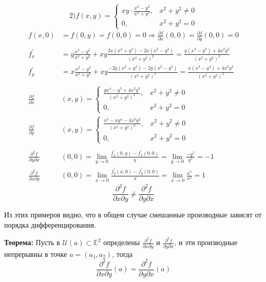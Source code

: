 \documentclass[a4paper,12pt]{article} %
\begin{document}
	\vspace{10mm}
	$$
	2)f(x, y) = 
	\begin{cases*} 
		xy\cdot\frac{x^2-y^2}{x^2+y^2},& \text{$x^2+y^2\neq 0$}\\
		0,& \text{$x^2+y^2= 0$}
	\end{cases*}$$
    \begin{align*}
	f(x, 0) &= f(0, y) = f(0, 0) = 0 \Rightarrow \frac{\partial f}{\partial x}(0, 0) = \frac{\partial f}{\partial y}(0, 0) = 0\\&\\
	f^{'}_{x} &= y\frac{x^2-y^2}{x^2+y^2}+xy\frac{2x(x^2+y^2) - 2x(x^2-y^2)}{(x^2+y^2)^2} = \frac{y(x^4-y^4)+4x^2y^3}{(x^2+y^2)^2}\\
	f^{'}_{y} &= x\frac{x^2-y^2}{x^2+y^2}+xy\frac{-2y(x^2+y^2) - 2y(x^2-y^2)}{(x^2+y^2)^2} = \frac{x(x^4-y^4)+4x^3y^2}{(x^2+y^2)^2}\\&\\
	\frac{\partial f}{\partial x}&(x, y) =
	\begin{cases*}
		\frac{yx^4-y^5+4x^2y^3}{(x^2+y^2)^2}, &\text{$x^2+y^2\neq 0$}\\
		0, &\text{$x^2+y^2=0$}
	\end{cases*}\\
	\frac{\partial f}{\partial y}&(x, y) =
	\begin{cases*}
	\frac{x^5-xy^4-4x^3y^2}{(x^2+y^2)^2}, &\text{$x^2+y^2\neq 0$}\\
	0, &\text{$x^2+y^2=0$}
	\end{cases*}\\&\\
	\frac{\partial^2f}{\partial y\partial x}&(0, 0) = \lim_{y\to 0}\frac{f^{'}_x(0, y) - f^{'}_x(0, 0)}{y} = \lim_{y\to 0}\frac{-y^5}{y^5} = -1\\
	\frac{\partial^2f}{\partial x\partial y}&(0, 0) = \lim_{x\to 0}\frac{f^{'}_y(x, 0) - f^{'}_y(0, 0)}{x} = \lim_{x\to 0}\frac{x^5}{x^5} = 1
	\end{align*}
	\[
	\frac{\partial^2f}{\partial{x}\partial{y}} \neq \frac{\partial^2f}{\partial{y}\partial{x}}
	\]
	\vspace{5mm}
	
	Из этих примеров видно, что в общем случае смешанные производные зависят от порядка дифференцирования.
	\vspace{5mm} 
	
	\textbf{Теорема:} Пусть в $\mathscr{U}(a) \subset \mathbb{E}^2$ определены $\frac{\partial^2f}{\partial x\partial y}$ и $\frac{\partial^2f}{\partial y\partial x}$, и эти производные непрерывны в точке $a = (a_1, a_2)$, тогда
	\[
	\frac{\partial^2f}{\partial{x}\partial{y}}(a) = \frac{\partial^2f}{\partial{y}\partial{x}}(a)
	\]
	
\end{document}
